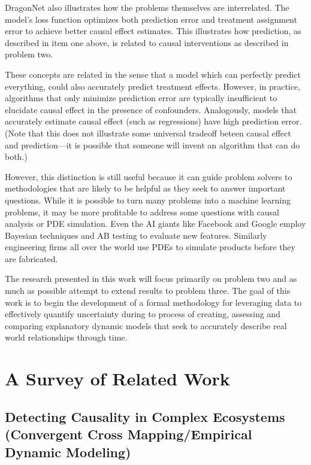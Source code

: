 \documentclass{article}
\begin{document}
DragonNet also illustrates how the problems themselves are interrelated. The model's loss function optimizes both
prediction error and treatment assignment error to achieve better causal effect estimates. This illustrates
how prediction, as described in item one above, is related to causal interventions as described in problem two. 

These concepts are related in the sense that a model which can perfectly predict everything, could also accurately
predict treatment effects. However, in practice, algorithms that only minimize prediction error are typically insufficient to 
elucidate causal effect in the presence of confounders. Analogously, models that accurately estimate causal effect 
(such as regressions) have high prediction error. (Note that this does not illustrate some universal
tradeoff beteen causal effect and prediction—it is possible that someone will invent an algorithm that can do both.)

However, this distinction is still useful because it can guide problem solvers to methodologies that are likely to
be helpful as they seek to answer important questions. While it is possible to turn many problems into a machine
learning problems, it may be more profitable to address some questions with causal analysis or PDE simulation.
Even the AI giants like Facebook and Google employ Bayesian techniques and AB testing to evaluate new features.
Similarly engineering firms all over the world use PDEs to simulate products before they are fabricated.

The research presented in this work will focus primarily on problem two and as much as possible attempt to extend results
to problem three. The goal of this work is to begin the development of a formal methodology for leveraging data to effectively
quantify uncertainty during to process of creating, assessing and comparing explanatory dynamic models that seek to accurately
describe real world relationships through time. 




\section{A Survey of Related Work}

    \subsection{Detecting Causality in Complex Ecosystems (Convergent Cross Mapping/Empirical Dynamic Modeling)}
\end{document}
